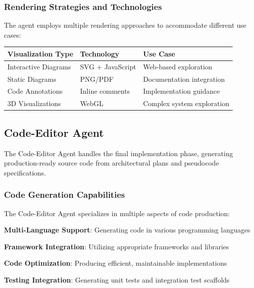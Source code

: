\subsubsection*{Rendering Strategies and Technologies}

The agent employs multiple rendering approaches to accommodate different use cases:

\begin{center}
\begin{tabular}{@{}lll@{}}
\toprule
\textbf{Visualization Type} & \textbf{Technology} & \textbf{Use Case} \\
\midrule
Interactive Diagrams & SVG + JavaScript & Web-based exploration \\
Static Diagrams & PNG/PDF & Documentation integration \\
Code Annotations & Inline comments & Implementation guidance \\
3D Visualizations & WebGL & Complex system exploration \\
\bottomrule
\end{tabular}
\end{center}

\subsection*{Code-Editor Agent}

The Code-Editor Agent handles the final implementation phase, generating production-ready source code from architectural plans and pseudocode specifications.

\subsubsection*{Code Generation Capabilities}

The Code-Editor Agent specializes in multiple aspects of code production:

\begin{expandedlist}
    \item \textbf{Multi-Language Support}: Generating code in various programming languages
    \item \textbf{Framework Integration}: Utilizing appropriate frameworks and libraries
    \item \textbf{Code Optimization}: Producing efficient, maintainable implementations
    \item \textbf{Testing Integration}: Generating unit tests and integration test scaffolds
\end{expandedlist}

